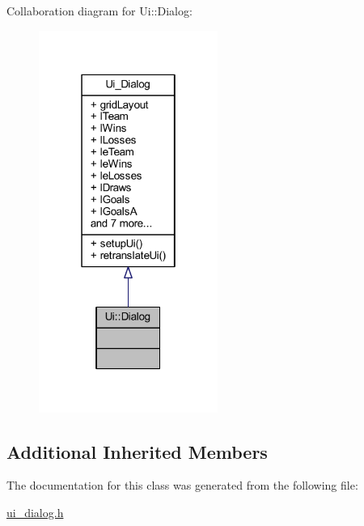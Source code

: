Collaboration diagram for Ui\+:\+:Dialog\+:
\nopagebreak
\begin{figure}[H]
\begin{center}
\leavevmode
\includegraphics[width=166pt]{df/d79/class_ui_1_1_dialog__coll__graph}
\end{center}
\end{figure}
\subsection*{Additional Inherited Members}


The documentation for this class was generated from the following file\+:\begin{DoxyCompactItemize}
\item 
\hyperlink{ui__dialog_8h}{ui\+\_\+dialog.\+h}\end{DoxyCompactItemize}
